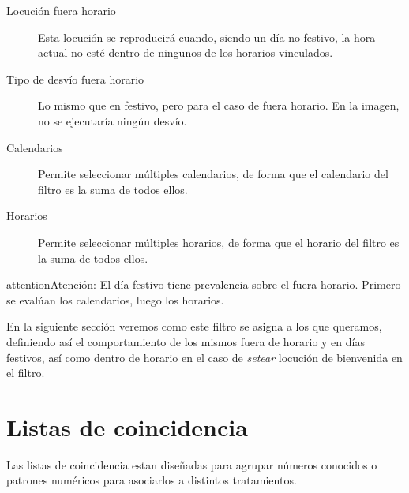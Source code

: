 \documentclass[letterpaper,10pt,spanish]{sphinxmanual}
\begin{document}
\begin{description}
\item[{Locución fuera horario}] \leavevmode{}\label{pbx_features/external_filters:term-out-of-schedule-locution}
Esta locución se reproducirá cuando, siendo un día no festivo, la hora actual no esté dentro de ningunos de los horarios vinculados.

\item[{Tipo de desvío fuera horario}] \leavevmode{}\label{pbx_features/external_filters:term-out-of-schedule-forward-type}
Lo mismo que en festivo, pero para el caso de fuera horario. En la imagen, no se ejecutaría ningún desvío.

\item[{Calendarios}] \leavevmode{}\label{pbx_features/external_filters:term-calendars}
Permite seleccionar múltiples calendarios, de forma que el calendario del filtro es la suma de todos ellos.

\item[{Horarios}] \leavevmode{}\label{pbx_features/external_filters:term-schedules}
Permite seleccionar múltiples horarios, de forma que el horario del filtro es la suma de todos ellos.

\end{description}

\begin{notice}{attention}{Atención:}
El día festivo tiene prevalencia sobre el fuera horario. Primero se evalúan los calendarios, luego los horarios.
\end{notice}

En la siguiente sección veremos como este filtro se asigna a los {\hyperref[pbx_features/external_ddis:external\string-ddis]{}} que queramos, definiendo así el comportamiento de los mismos fuera de horario y en días festivos, así como dentro de horario en el caso de \emph{setear} locución de bienvenida en el filtro.


\section{Listas de coincidencia}
\label{pbx_features/match_lists:match-lists}\label{pbx_features/match_lists::doc}\label{pbx_features/match_lists:id1}
Las listas de coincidencia estan diseñadas para agrupar números conocidos o patrones numéricos para asociarlos a distintos tratamientos.
\end{document}
